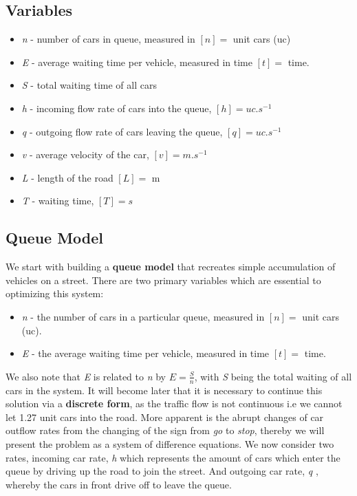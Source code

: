 \documentclass[a4paper]{article}
\begin{document}
\subsection{Variables}

\begin{itemize}
\item \textit{n} - number of cars in queue, measured in $[n] =$ unit cars (uc)
\item \textit{E} - average waiting time per vehicle, measured in time $[t] =$ time.
\item \textit{S} - total waiting time of all cars
\item \textit{h} - incoming flow rate of cars into the queue, $[h] = uc.s^{-1}$
\item \textit{q} - outgoing flow rate of cars leaving the queue, $[q] = uc.s^{-1}$
\item \textit{v} - average velocity of the car, $[v] =m.s^{-1}$ 
\item \textit{L} - length of the road $[L] = $ m
\item \textit{T} - waiting time, $[T] = s$
\end{itemize}

\subsection{Queue Model}

We start with building a \textbf{queue model} that recreates simple accumulation of vehicles on a street. There are two primary variables which are essential to optimizing this system:

\begin{itemize}
\item \textit{n} - the number of cars in a particular queue, measured in $[n] =$ unit cars (uc).
\item \textit{E} - the average waiting time per vehicle, measured in time $[t] =$ time.
\end{itemize}

We also note that \textit{E} is related to \textit{n} by $E = \frac{S}{n}$, with \textit{S} being the total waiting of all cars in the system. It will become later that it is necessary to continue this solution via a \textbf{discrete form}, as the traffic flow is not continuous i.e we cannot let 1.27 unit cars into the road. More apparent is the abrupt changes of car outflow rates from the changing of the sign from \textit{go} to \textit{stop}, thereby we will present the problem as a system of difference equations.
We now consider two rates, incoming car rate, \textit{h} which represents the amount of cars which enter the queue by driving up the road to join the street. And outgoing car rate, \textit{q} , whereby the cars in front drive off to leave the queue. 
\end{document}
